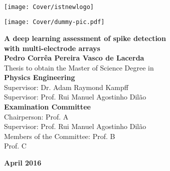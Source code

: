 \setcounter{page}{1} 


\thispagestyle{empty}
\begin{flushleft} ~\\ \vspace{-12mm} \hspace{-12mm}  \texttt{[image: Cover/istnewlogo]} 
\vspace{10mm}
\\ \begin{center} \texttt{[image: Cover/dummy-pic.pdf]}  \end{center} %
 \vspace{5mm}
\centering
\LARGE \textbf{A deep learning assessment of spike detection \\ with multi-electrode arrays}
\\ \vspace{10mm}
\Large \textbf{Pedro Corrêa Pereira Vasco de Lacerda} \\
\vspace{12mm}
\large Thesis to obtain the Master of Science Degree in
\\ \vspace{2mm}
\LARGE \textbf{Physics Engineering}
\\ \vspace{10mm}
\large Supervisor: Dr. Adam Raymond Kampff \\
\large Supervisor: Prof. Rui Manuel Agostinho Dilão
\\ \vspace{15mm}
\Large \textbf{Examination Committee}
\\ \vspace{5mm}
\large Chairperson:	Prof. A \\
\large Supervisor: Prof. Rui Manuel Agostinho Dilão \\
\large Members of the Committee: Prof. B \\
Prof. C
 
\vspace{15mm}

\Large \textbf{April 2016} \\
\let\thepage\relax
\end{flushleft}
\pagebreak


\clearpage

\thispagestyle{empty}
\cleardoublepage

\setcounter{page}{1} 

\baselineskip 18pt %
